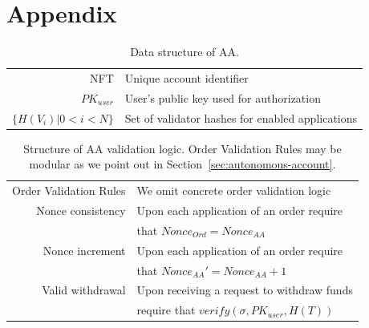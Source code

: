 \documentclass[11pt]{article}
\begin{document}
\begin{sloppypar}
        \newpage
        \appendix
        \section*{Appendix}\label{sec:appendix}

        \begin{table}[h!]
            \begin{center}
                \begin{tabular}{ | r l | }
                    \hline
                    NFT                      & Unique account identifier                        \\
                    $PK_{user}$              & User's public key used for authorization         \\
                    $\{H(V_i) | 0 < i < N\}$ & Set of validator hashes for enabled applications \\
                    \hline
                \end{tabular}
            \end{center}
            \caption{Data structure of AA.}
            \label{tab:table3}
        \end{table}

        \begin{table}[h!]
            \begin{center}
                \begin{tabular}{ | r l | }
                    \hline
                    Order Validation Rules & We omit concrete order validation logic        \\
                    Nonce consistency      & Upon each application of an order require      \\
                    \space                 & that $Nonce_{Ord} = Nonce_{AA}$                \\
                    Nonce increment        & Upon each application of an order require      \\
                    \space                 & that $Nonce_{AA}' = Nonce_{AA} + 1$            \\
                    Valid withdrawal       & Upon receiving a request to withdraw funds     \\
                    \space                 & require that $verify(\sigma, PK_{user}, H(T))$ \\
                    \hline
                \end{tabular}
            \end{center}
            \caption{Structure of AA validation logic. Order Validation Rules may be modular as we point out in Section~\ref{sec:autonomous-account}.}
            \label{tab:table2}
        \end{table}


\end{sloppypar}
\end{document}
